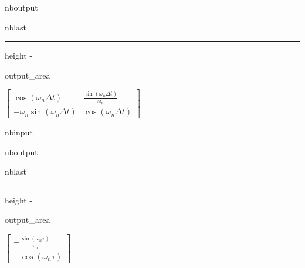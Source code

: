 \documentclass[letterpaper,10pt,english]{sphinxmanual}
\begin{document}
\begin{sphinxuseclass}{nboutput}
\begin{sphinxuseclass}{nblast}
\hrule height -\fboxrule\relax
\vspace{\nbsphinxcodecellspacing}

\savebox\nbsphinxpromptbox[0pt][r]{\color{nbsphinxout}\Verb|\strut{[29]:}\,|}

\begin{nbsphinxfancyoutput}

\begin{sphinxuseclass}{output_area}
\begin{sphinxuseclass}{}$\displaystyle \left[\begin{matrix}\cos{\left(\omega_{n} {\Delta}t \right)} & \frac{\sin{\left(\omega_{n} {\Delta}t \right)}}{\omega_{n}}\\- \omega_{n} \sin{\left(\omega_{n} {\Delta}t \right)} & \cos{\left(\omega_{n} {\Delta}t \right)}\end{matrix}\right]$
\end{sphinxuseclass}
\end{sphinxuseclass}
\end{nbsphinxfancyoutput}

\end{sphinxuseclass}
\end{sphinxuseclass}
\begin{sphinxuseclass}{nbinput}
{
\begin{sphinxVerbatim}[commandchars=\\\{\}]
\llap{\color{nbsphinxin}[30]:\,\hspace{\fboxrule}\hspace{\fboxsep}}  
\end{sphinxVerbatim}
}

\end{sphinxuseclass}
\begin{sphinxuseclass}{nboutput}
\begin{sphinxuseclass}{nblast}
\hrule height -\fboxrule\relax
\vspace{\nbsphinxcodecellspacing}

\savebox\nbsphinxpromptbox[0pt][r]{\color{nbsphinxout}\Verb|\strut{[30]:}\,|}

\begin{nbsphinxfancyoutput}

\begin{sphinxuseclass}{output_area}
\begin{sphinxuseclass}{}$\displaystyle \left[\begin{matrix}- \frac{\sin{\left(\omega_{n} \tau \right)}}{\omega_{n}}\\- \cos{\left(\omega_{n} \tau \right)}\end{matrix}\right]$
\end{sphinxuseclass}
\end{sphinxuseclass}
\end{nbsphinxfancyoutput}

\end{sphinxuseclass}
\end{sphinxuseclass}
\end{document}
